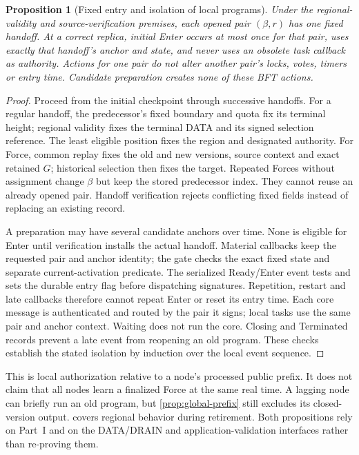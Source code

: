 \documentclass[11pt,a4paper]{article}
\newtheorem{proposition}[proposition]{Proposition}
\begin{document}
\begin{proposition}[Fixed entry and isolation of local programs]
\label{prop:program-isolation}
Under the regional-validity and source-verification premises, each
opened pair $(\beta,r)$ has one fixed handoff. At a correct replica,
initial Enter occurs at most once for that pair, uses exactly that
handoff's anchor and state, and never uses an obsolete task callback
as authority. Actions for one pair do not alter another pair's locks,
votes, timers or entry time. Candidate preparation creates none of
these BFT actions.
\end{proposition}
\begin{proof}
Proceed from the initial checkpoint through successive handoffs.
For a regular handoff, the predecessor's fixed boundary and quota fix
its terminal height; regional validity fixes the terminal DATA and its
signed selection reference. The least eligible position fixes the
region and designated authority. For Force, common replay fixes the
old and new versions, source context and exact retained $G$; historical
selection then fixes the target. Repeated Forces without assignment
change $\beta$ but keep the stored predecessor index. They cannot
reuse an already opened pair. Handoff verification rejects conflicting
fixed fields instead of replacing an existing record.

A preparation may have several candidate anchors over time. None is
eligible for Enter until verification installs the actual handoff.
Material callbacks keep the requested pair and anchor identity;
the gate checks the exact fixed state and separate current-activation predicate.
The serialized Ready/Enter event tests and sets the durable entry flag
before dispatching signatures. Repetition, restart and late callbacks
therefore cannot repeat Enter or reset its entry time. Each core
message is authenticated and routed by the pair it signs; local tasks
use the same pair and anchor context. Waiting does not run the core.
Closing and Terminated records prevent a late event from reopening an
old program. These checks establish the stated isolation by induction
over the local event sequence.
\end{proof}

This is local authorization relative to a node's processed public
prefix. It does not claim that all nodes learn a finalized Force at the
same real time. A lagging node can briefly run an old program, but
\cref{prop:global-prefix} still excludes its closed-version output.
 covers regional behavior during
retirement. Both propositions rely on Part~I and on the DATA/DRAIN and
application-validation interfaces rather than re-proving them.
\end{document}
